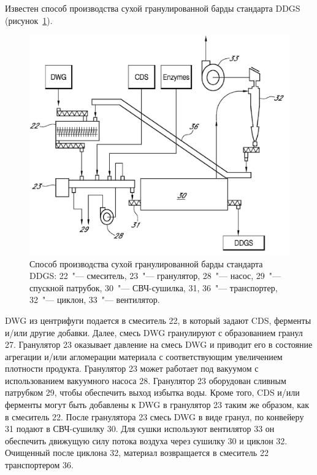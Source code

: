 Известен способ производства сухой гранулированной барды стандарта DDGS \cite{Meier.Method.2008} (рисунок~\ref{fig:stillage_meier}).
\begin{figure}[htb]
\centering
\includegraphics[width=\textwidth]{figures/temp/meier.jpg}
\caption[Способ производства сухой барды стандарта DDGS]{Способ производства сухой гранулированной барды стандарта DDGS:
22~"--- смеситель, 23~"--- гранулятор, 28~"--- насос, 29~"--- спускной патрубок, 30~"--- СВЧ-сушилка, 31, 36~"--- транспортер, 32~"--- циклон, 33~"--- вентилятор.}\label{fig:stillage_meier}
\end{figure}
DWG из центрифуги подается в смеситель 22, в который задают CDS, ферменты и/или другие добавки.
Далее, смесь DWG гранулируют с образованием гранул 27.
Гранулятор 23 оказывает давление на смесь DWG и приводит его в состояние агрегации и/или агломерации материала с соответствующим увеличением плотности продукта. 
Гранулятор 23 может работает под вакуумом с использованием вакуумного насоса 28.
Гранулятор 23 оборудован сливным патрубком 29, чтобы обеспечить выход избытка воды.
Кроме того, CDS и/или ферменты могут быть добавлены к DWG в гранулятор 23 таким же образом, как в смеситель 22.
После гранулятора 23 смесь DWG в виде гранул, по конвейеру 31 подают в СВЧ-сушилку 30.
Для сушки используют вентилятор 33 он обеспечить движущую силу потока воздуха через сушилку 30 и циклон 32.
Очищенный после циклона 32, материал возвращается в смеситель 22 транспортером 36.

